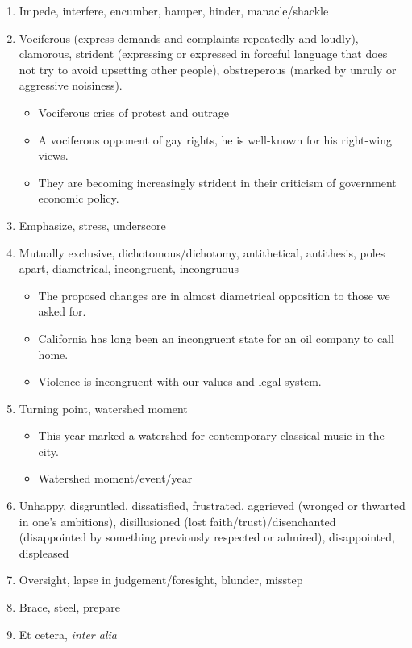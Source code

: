 \documentclass[oneside]{book}
\begin{document}
\begin{enumerate}
\begin{itemize}
    \end{itemize}
    \item Impede, interfere, encumber, hamper, hinder, manacle/shackle
    \item Vociferous (express demands and complaints repeatedly and loudly), clamorous, strident (expressing or expressed in forceful language that does not try to avoid upsetting other people), obstreperous (marked by unruly or aggressive noisiness).
    \begin{itemize}
        \item Vociferous cries of protest and outrage 
        \item A vociferous opponent of gay rights, he is well-known for his right-wing views.
        \item They are becoming increasingly strident in their criticism of government economic policy.
    \end{itemize}
    \item Emphasize, stress, underscore
    \item Mutually exclusive, dichotomous/dichotomy, antithetical, antithesis, poles apart, diametrical, incongruent, incongruous
    \begin{itemize}
        \item The proposed changes are in almost diametrical opposition to those we asked for.
        \item California has long been an incongruent state for an oil company to call home.
        \item Violence is incongruent with our values and legal system.
    \end{itemize}
    \item Turning point, watershed moment
    \begin{itemize}
        \item This year marked a watershed for contemporary classical music in the city.
        \item Watershed moment/event/year
    \end{itemize}
    \item Unhappy, disgruntled, dissatisfied, frustrated, aggrieved (wronged or thwarted in one's ambitions), disillusioned (lost faith/trust)/disenchanted (disappointed by something previously respected or admired), disappointed, displeased
    \item Oversight, lapse in judgement/foresight, blunder, misstep 
    \item Brace, steel, prepare
    \item Et cetera, \emph{inter alia}

\end{enumerate}
\end{document}
